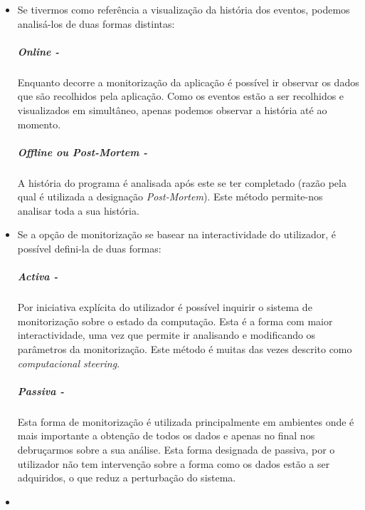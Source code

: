 \begin{itemize}
 \item 


Se tivermos como referência a visualização da história dos eventos, podemos analisá-los de duas formas distintas:
\subparagraph*{Online - }
Enquanto decorre a monitorização da aplicação é possível ir observar os dados que são recolhidos pela aplicação.
Como os eventos estão a ser recolhidos e visualizados em simultâneo, apenas podemos observar a história até ao momento.

\subparagraph*{Offline ou \textit{Post-Mortem} - }
A história do programa é analisada após este se ter completado (razão pela qual é utilizada a designação \textit{Post-Mortem}).
Este método permite-nos analisar toda a sua história.

\item

Se a opção de monitorização se basear na interactividade do utilizador, é possível defini-la de duas formas:

\subparagraph*{Activa - }

Por iniciativa explícita do utilizador é possível inquirir o sistema de monitorização sobre o estado da computação.
Esta é a forma com maior interactividade, uma vez que permite ir analisando e modificando os parâmetros da monitorização.
Este método é muitas das vezes descrito como \textit{computacional steering}.


\subparagraph*{Passiva - }
Esta forma de monitorização é utilizada principalmente em ambientes onde é mais importante a obtenção de todos os dados e apenas no final nos debruçarmos sobre a sua análise.
Esta forma designada de passiva, por o utilizador não tem intervenção sobre a forma como os dados estão a ser adquiridos, o que reduz a perturbação do sistema. 
\item


\end{itemize}
